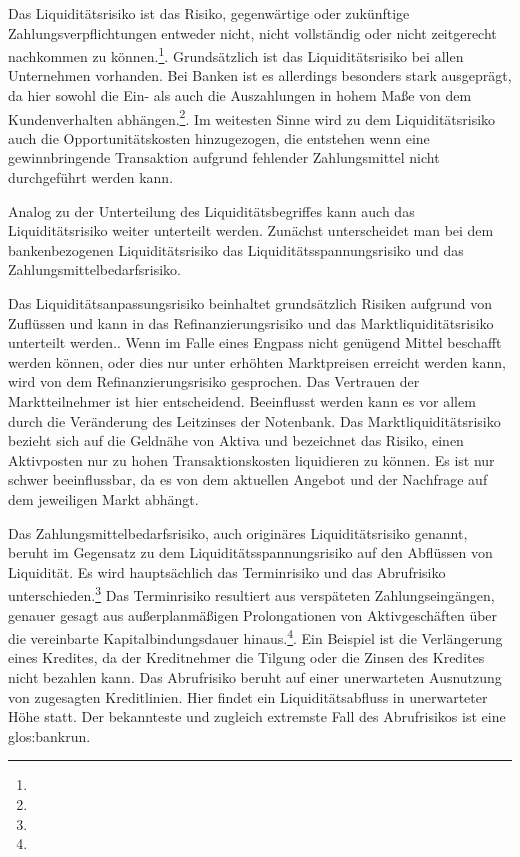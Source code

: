 \begin{onehalfspacing}
Das Liquiditätsrisiko ist das Risiko, gegenwärtige oder zukünftige Zahlungsverpflichtungen entweder nicht, nicht vollständig oder nicht zeitgerecht nachkommen zu können.\footnote{  }. Grundsätzlich ist das Liquiditätsrisiko bei allen Unternehmen vorhanden. Bei Banken ist es allerdings besonders stark ausgeprägt, da hier sowohl die Ein- als auch die Auszahlungen in hohem Maße von dem Kundenverhalten abhängen.\footnote{ }. Im weitesten Sinne wird zu dem Liquiditätsrisiko auch die Opportunitätskosten hinzugezogen, die entstehen wenn eine gewinnbringende Transaktion aufgrund fehlender Zahlungsmittel nicht durchgeführt werden kann.

Analog zu der Unterteilung des Liquiditätsbegriffes kann auch das Liquiditätsrisiko weiter unterteilt werden. Zunächst unterscheidet man bei dem bankenbezogenen Liquiditätsrisiko das Liquiditätsspannungsrisiko und das Zahlungsmittelbedarfsrisiko.

Das Liquiditätsanpassungsrisiko beinhaltet grundsätzlich Risiken aufgrund von Zuflüssen und kann in das Refinanzierungsrisiko und das Marktliquiditätsrisiko unterteilt werden.. Wenn im Falle eines Engpass nicht genügend Mittel beschafft werden können, oder dies nur unter erhöhten Marktpreisen erreicht werden kann, wird von dem Refinanzierungsrisiko gesprochen. Das Vertrauen der Marktteilnehmer ist hier entscheidend. Beeinflusst werden kann es vor allem durch die Veränderung des Leitzinses der Notenbank. Das Marktliquiditätsrisiko bezieht sich auf die Geldnähe von Aktiva und bezeichnet das Risiko, einen Aktivposten nur zu hohen Transaktionskosten liquidieren zu können. Es ist nur schwer beeinflussbar, da es von dem aktuellen Angebot und der Nachfrage auf dem jeweiligen Markt abhängt.

Das Zahlungsmittelbedarfsrisiko, auch originäres Liquiditätsrisiko genannt, beruht im Gegensatz zu dem Liquiditätsspannungsrisiko auf den Abflüssen von Liquidität. Es wird hauptsächlich das Terminrisiko und das Abrufrisiko unterschieden.\footnote{ } Das Terminrisiko resultiert aus verspäteten Zahlungseingängen, genauer gesagt aus außerplanmäßigen Prolongationen von Aktivgeschäften über die vereinbarte Kapitalbindungsdauer hinaus.\footnote{ }. Ein Beispiel ist die Verlängerung eines Kredites, da der Kreditnehmer die Tilgung oder die Zinsen des Kredites nicht bezahlen kann. Das Abrufrisiko beruht auf einer unerwarteten Ausnutzung von zugesagten Kreditlinien. Hier findet ein Liquiditätsabfluss in unerwarteter Höhe statt. Der bekannteste und zugleich extremste Fall des Abrufrisikos ist eine \gls{glos:bankrun}.



\end{onehalfspacing}
